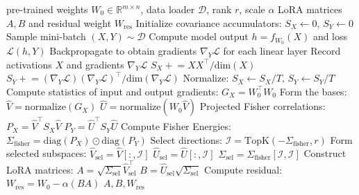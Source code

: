 \documentclass{article}
\theoremstyle{plain}
\theoremstyle{definition}
\theoremstyle{remark}
\begin{document}
\begin{algorithm}[tb]
   \caption{Fisher-Guided LoRA Initialization}
   \label{alg:fisher_lora}
\begin{algorithmic}
    pre-trained weights $W_0 \in \mathbb{R}^{m \times n}$, data loader $\mathcal{D}$, rank $r$, scale $\alpha$
    LoRA matrices $A, B$ and residual weight $W_{\text{res}}$
   \STATE Initialize covariance accumulators: $S_X \leftarrow 0$, $S_Y \leftarrow 0$
   \REPEAT
       \STATE Sample mini-batch $(X, Y) \sim \mathcal{D}$
       \STATE Compute model output $h = f_{W_0}(X)$ and loss $\mathcal{L}(h, Y)$
       \STATE Backpropagate to obtain gradients $\nabla_Y \mathcal{L}$ for each linear layer
       \STATE Record activations $X$ and gradients $\nabla_Y \mathcal{L}$
       \STATE $S_X \mathrel{+}= X X^\top / \mathrm{dim}(X)$
       \STATE $S_Y \mathrel{+}= (\nabla_Y \mathcal{L}) (\nabla_Y \mathcal{L})^\top / \mathrm{dim}(\nabla_Y \mathcal{L})$
   \STATE Normalize: $S_X \leftarrow S_X / T$, \quad $S_Y \leftarrow S_Y / T$
   \STATE Compute statistics of input and output gradients: $G_X = W_0^\top W_0$
   \STATE Form the bases:
   \STATE \hspace{1em} $\hat{V} = \mathrm{normalize}(G_X)$
   \STATE \hspace{1em} $\hat{U} = \mathrm{normalize}(W_0 \hat{V})$
   \STATE Projected Fisher correlations:
   \STATE \hspace{1em} $P_X = \hat{V}^\top S_X \hat{V}$
   \STATE \hspace{1em} $P_Y = \hat{U}^\top S_Y \hat{U}$
   \STATE Compute Fisher Energies: $\Sigma_{\text{fisher}} = \mathrm{diag}(P_X) \odot \mathrm{diag}(P_Y)$
   \STATE Select directions:
   \STATE \hspace{1em} $\mathcal{I} = \mathrm{TopK}(-\Sigma_{\text{fisher}}, r)$
   \STATE Form selected subspaces:
   \STATE \hspace{1em} $\hat{V}_{\text{sel}} = \hat{V}[:, \mathcal{I}]$
   \STATE \hspace{1em} $\hat{U}_{\text{sel}} = \hat{U}[:, \mathcal{I}]$
   \STATE \hspace{1em} $\Sigma_{\text{sel}} = \Sigma_{\text{fisher}}[\mathcal{I}, \mathcal{I}]$
   \STATE Construct LoRA matrices:
   \STATE \hspace{1em} $A = \sqrt{\Sigma_{\text{sel}}} \hat{V}_{\text{sel}}^\top$
   \STATE \hspace{1em} $B = \hat{U}_{\text{sel}} \sqrt{\Sigma_{\text{sel}}}$
   \STATE Compute residual: $W_{\text{res}} = W_0 - \alpha (B A)$
    $A, B, W_{\text{res}}$
\end{algorithmic}
\end{algorithm}
\end{document}
